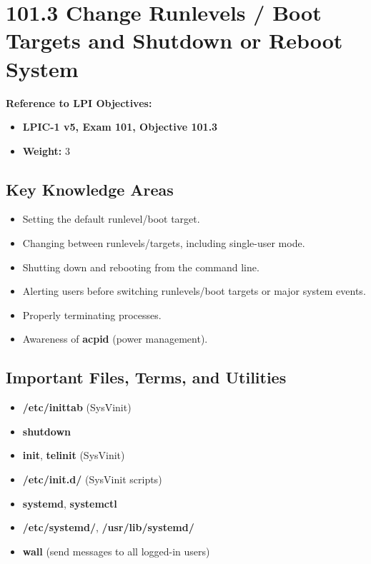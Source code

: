 \documentclass[a4paper]{report}
\begin{document}

\section*{101.3 Change Runlevels / Boot Targets and Shutdown or Reboot System}

\textbf{Reference to LPI Objectives:}  
\begin{itemize}
    \item \textbf{LPIC-1 v5, Exam 101, Objective 101.3}
    \item \textbf{Weight:} 3
\end{itemize}

\subsection*{Key Knowledge Areas}
\begin{itemize}
    \item Setting the default runlevel/boot target.
    \item Changing between runlevels/targets, including single-user mode.
    \item Shutting down and rebooting from the command line.
    \item Alerting users before switching runlevels/boot targets or major system events.
    \item Properly terminating processes.
    \item Awareness of \textbf{acpid} (power management).
\end{itemize}

\subsection*{Important Files, Terms, and Utilities}
\begin{itemize}
    \item \textbf{/etc/inittab} (SysVinit)
    \item \textbf{shutdown}
    \item \textbf{init}, \textbf{telinit} (SysVinit)
    \item \textbf{/etc/init.d/} (SysVinit scripts)
    \item \textbf{systemd}, \textbf{systemctl}
    \item \textbf{/etc/systemd/}, \textbf{/usr/lib/systemd/}
    \item \textbf{wall} (send messages to all logged-in users)
\end{itemize}
\end{document}
